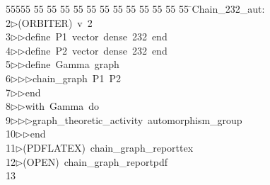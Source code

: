 %
%
\begin{tabbing}
55555 \= 55 \= 55 \= 55 \= 55 \= 55 \= 55 \= 55 \= 55 \= 55 \= 55 \= 55 \= 55 \= \>Chain\_232\_aut:\\[0pt]
2\>$\triangleright$\>(ORBITER)\ v\ 2\ \\[0pt]
3\>$\triangleright$\>$\triangleright$\>define\ P1\ vector\ dense\ 232\ end\ \\[0pt]
4\>$\triangleright$\>$\triangleright$\>define\ P2\ vector\ dense\ 232\ end\ \\[0pt]
5\>$\triangleright$\>$\triangleright$\>define\ Gamma\ graph\ \\[0pt]
6\>$\triangleright$\>$\triangleright$\>$\triangleright$\>chain\_graph\ P1\ P2\ \\[0pt]
7\>$\triangleright$\>$\triangleright$\>end\ \\[0pt]
8\>$\triangleright$\>$\triangleright$\>with\ Gamma\ do\ \\[0pt]
9\>$\triangleright$\>$\triangleright$\>$\triangleright$\>graph\_theoretic\_activity\ automorphism\_group\ \\[0pt]
10\>$\triangleright$\>$\triangleright$\>end\\[0pt]
11\>$\triangleright$\>(PDFLATEX)\ chain\_graph\_reporttex\\[0pt]
12\>$\triangleright$\>(OPEN)\ chain\_graph\_reportpdf\\[0pt]
13\>\end{tabbing}
